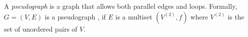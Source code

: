 \documentclass[12pt]{article}
\begin{document}
A \emph{pseudograph} is a graph that allows both parallel edges and loops.
Formally, $G=(V, E)$ is a pseudograph , if $E$ is a multiset $(V^{(2)}, f)$
where $V^{(2)}$ is the set of unordered pairs of $V$.
\end{document}
